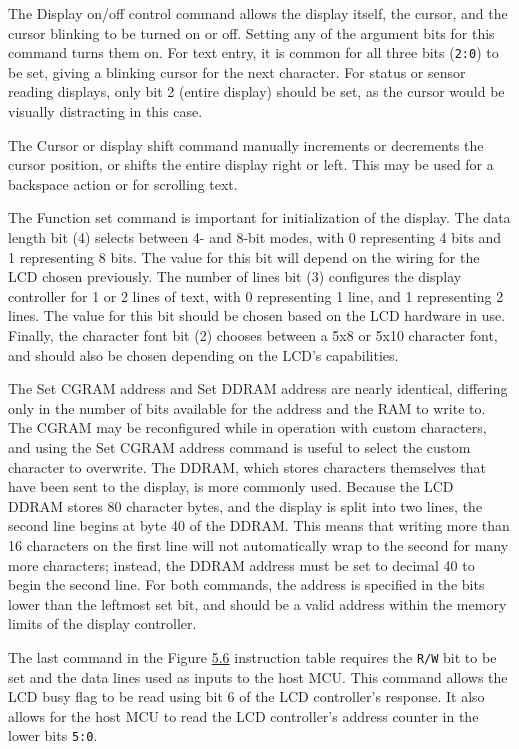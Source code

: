 \documentclass[
  9pt,
  letterpaper,
  abstract,
  titlepage]{scrbook}
\begin{document}
The Display on/off control command allows the display itself, the
cursor, and the cursor blinking to be turned on or off. Setting any of
the argument bits for this command turns them on. For text entry, it is
common for all three bits (\texttt{2:0}) to be set, giving a blinking
cursor for the next character. For status or sensor reading displays,
only bit 2 (entire display) should be set, as the cursor would be
visually distracting in this case.

The Cursor or display shift command manually increments or decrements
the cursor position, or shifts the entire display right or left. This
may be used for a backspace action or for scrolling text.

The Function set command is important for initialization of the display.
The data length bit (4) selects between 4- and 8-bit modes, with 0
representing 4 bits and 1 representing 8 bits. The value for this bit
will depend on the wiring for the LCD chosen previously. The number of
lines bit (3) configures the display controller for 1 or 2 lines of
text, with 0 representing 1 line, and 1 representing 2 lines. The value
for this bit should be chosen based on the LCD hardware in use. Finally,
the character font bit (2) chooses between a 5x8 or 5x10 character font,
and should also be chosen depending on the LCD's capabilities.

The Set CGRAM address and Set DDRAM address are nearly identical,
differing only in the number of bits available for the address and the
RAM to write to. The CGRAM may be reconfigured while in operation with
custom characters, and using the Set CGRAM address command is useful to
select the custom character to overwrite. The DDRAM, which stores
characters themselves that have been sent to the display, is more
commonly used. Because the LCD DDRAM stores 80 character bytes, and the
display is split into two lines, the second line begins at byte 40 of
the DDRAM. This means that writing more than 16 characters on the first
line will not automatically wrap to the second for many more characters;
instead, the DDRAM address must be set to decimal 40 to begin the second
line. For both commands, the address is specified in the bits lower than
the leftmost set bit, and should be a valid address within the memory
limits of the display controller.

The last command in the Figure \hyperref[fig:lcdinstructions]{5.6}
instruction table requires the \texttt{R/W} bit to be set and the data
lines used as inputs to the host MCU. This command allows the LCD busy
flag to be read using bit 6 of the LCD controller's response. It also
allows for the host MCU to read the LCD controller's address counter in
the lower bits \texttt{5:0}.
\end{document}
